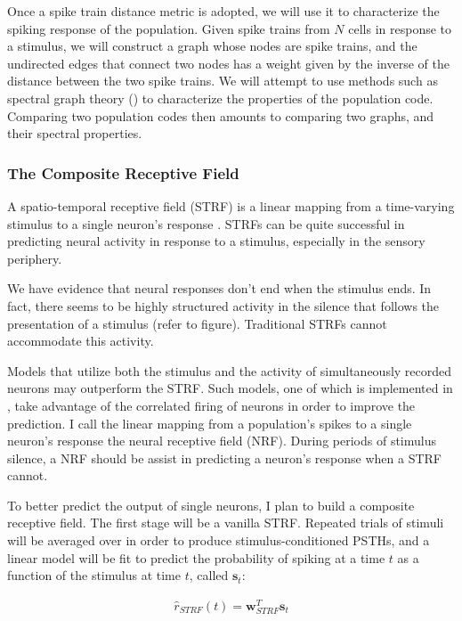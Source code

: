 Once a spike train distance metric is adopted, we will use it to characterize the spiking response
of the population. Given spike trains from $N$ cells in response to a stimulus, we will construct a
graph whose nodes are spike trains, and the undirected edges that connect two nodes has a weight given
by the inverse of the distance between the two spike trains. We will attempt to use methods such as
spectral graph theory (\cite{Azran2006}) to characterize the properties of the population code. Comparing
two population codes then amounts to comparing two graphs, and their spectral properties.

\subsubsection{The Composite Receptive Field}
\label{sec:receptive_field}

A spatio-temporal receptive field (STRF) is a linear mapping from a time-varying stimulus to a
single neuron's response \cite{Theunissen2001}. STRFs can be quite successful in predicting
neural activity in response to a stimulus, especially in the sensory periphery.

We have evidence that neural responses don't end when the stimulus ends. In fact, there seems
to be highly structured activity in the silence that follows the presentation of a stimulus
(refer to figure). Traditional STRFs cannot accommodate this activity.

Models that utilize both the stimulus and the activity of simultaneously recorded neurons may
outperform the STRF. Such models, one of which is implemented in \cite{Pillow2008}, take
advantage of the correlated firing of neurons in order to improve the prediction. I call the linear
mapping from a population's spikes to a single neuron's response the neural receptive field (NRF).
During periods of stimulus silence, a NRF should be assist in predicting a neuron's response when
a STRF cannot.

To better predict the output of single neurons, I plan to build a composite receptive field. The
first stage will be a vanilla STRF. Repeated trials of stimuli will be averaged over in order to
produce stimulus-conditioned PSTHs, and a linear model will be fit to predict the probability of
spiking at a time $t$ as a function of the stimulus at time $t$, called $\bm{s}_t$:

\begin{align}
\hat{r}_{STRF}(t) = \bm{w}_{STRF}^T \bm{s}_t
\end{align}

